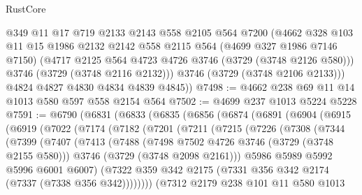 \begin{lexlean}{RustCore}
\begin{coremodule}
          @349
          @11
          @17
          @719
          @2133
          @2143
          @558
          @2105
          @564
          @7200
          (@4662
            @328
            @103
            @11
            @15
            @1986
            @2132
            @2142
            @558
            @2115
            @564
            (@4699 @327 @1986 @7146 @7150)
            (@4717 @2125 @564 @4723 @4726 @3746 (@3729 (@3748 @2126 @580)))
            @3746
            (@3729 (@3748 @2116 @2132)))
          @3746
          (@3729 (@3748 @2106 @2133)))
        @4824
        @4827
        @4830
        @4834
        @4839
        @4845))
@7498 := @4662 @238 @69 @11 @14 @1013 @580 @597 @558 @2154 @564
@7502 := @4699 @237 @1013 @5224 @5228
@7591 := @6790
    (@6831
      (@6833
        (@6835
          (@6856
            (@6874
              (@6891
                (@6904
                  (@6915
                    (@6919
                      (@7022
                        (@7174
                          (@7182
                            (@7201
                              (@7211
                                (@7215
                                  (@7226
                                    (@7308
                                      (@7344
                                        (@7399
                                          (@7407
                                            (@7413
                                              (@7488
                                                (@7498 @7502 @4726 @3746 (@3729 (@3748 @2155 @580)))
                                                @3746
                                                (@3729 (@3748 @2098 @2161)))
                                              @5986
                                              @5989
                                              @5992
                                              @5996
                                              @6001
                                              @6007)
                                            (@7322
                                              @359
                                              @342
                                              @2175
                                              (@7331 @356 @342 @2174 (@7337 (@7338 @356 @342))))))))
                                    (@7312
                                      @2179
                                      @238
                                      @101
                                      @11
                                      @580
                                      @1013

\end{coremodule}
\end{lexlean}
